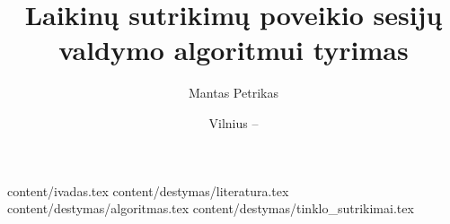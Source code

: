 \documentclass{VUMIFPSkursinis}
\title{Laikinų sutrikimų poveikio sesijų valdymo algoritmui tyrimas}
\author{Mantas Petrikas}
\date{Vilnius – \the\year}
\begin{document}
\maketitle

\tableofcontents

 {content/ivadas.tex}
 {content/destymas/literatura.tex}
 {content/destymas/algoritmas.tex}
 {content/destymas/tinklo_sutrikimai.tex}














































\end{document}
